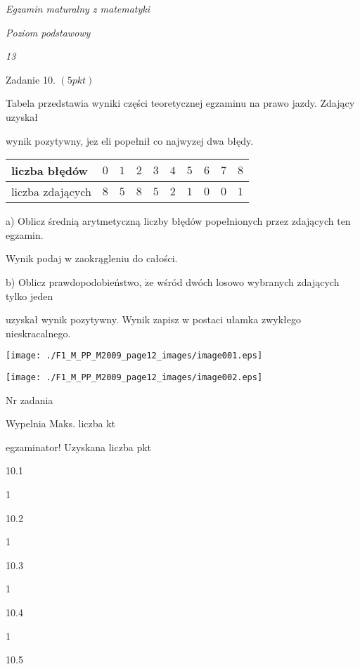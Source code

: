 \documentclass[a4paper,12pt]{article}
\begin{document}
{\it Egzamin maturalny z matematyki}

{\it Poziom podstawowy}

{\it 13}

Zadanie 10. $(5pkt)$

Tabela przedstawia wyniki części teoretycznej egzaminu na prawo jazdy. Zdający uzyskał

wynik pozytywny, $\mathrm{j}\mathrm{e}\dot{\mathrm{z}}$ eli popełnił co najwyzej dwa błędy.
\begin{center}
\begin{tabular}{|l|l|l|l|l|l|l|l|l|l|}
\hline
\multicolumn{1}{|l|}{liczba błędów}&	\multicolumn{1}{|l|}{$0$}&	\multicolumn{1}{|l|}{ $1$}&	\multicolumn{1}{|l|}{ $2$}&	\multicolumn{1}{|l|}{ $3$}&	\multicolumn{1}{|l|}{ $4$}&	\multicolumn{1}{|l|}{ $5$}&	\multicolumn{1}{|l|}{ $6$}&	\multicolumn{1}{|l|}{ $7$}&	\multicolumn{1}{|l|}{ $8$}	\\
\hline
\multicolumn{1}{|l|}{liczba zdających}&	\multicolumn{1}{|l|}{$8$}&	\multicolumn{1}{|l|}{ $5$}&	\multicolumn{1}{|l|}{ $8$}&	\multicolumn{1}{|l|}{ $5$}&	\multicolumn{1}{|l|}{ $2$}&	\multicolumn{1}{|l|}{ $1$}&	\multicolumn{1}{|l|}{ $0$}&	\multicolumn{1}{|l|}{ $0$}&	\multicolumn{1}{|l|}{ $1$}	\\
\hline
\end{tabular}

\end{center}
a) Oblicz średnią arytmetyczną liczby błędów popełnionych przez zdających ten egzamin.

Wynik podaj w zaokrągleniu do całości.

b) Oblicz prawdopodobieństwo, $\dot{\mathrm{z}}\mathrm{e}$ wśród dwóch losowo wybranych zdających tylko jeden

uzyskał wynik pozytywny. Wynik zapisz w postaci ułamka zwykłego nieskracalnego.
\begin{center}
\texttt{[image: ./F1\_M\_PP\_M2009\_page12\_images/image001.eps]}

\texttt{[image: ./F1\_M\_PP\_M2009\_page12\_images/image002.eps]}
\end{center}
Nr zadania

Wypelnia Maks. liczba kt

egzaminator! Uzyskana liczba pkt

10.1

1

10.2

1

10.3

1

10.4

1

10.5
\end{document}
